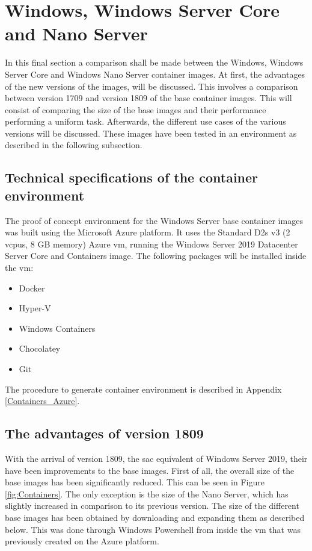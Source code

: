 \section{Windows, Windows Server Core and Nano Server}
In this final section a comparison shall be made between the Windows, Windows Server Core and Windows Nano Server container images. At first, the advantages of the new versions of the images, will be discussed. This involves a comparison between version 1709 and version 1809 of the base container images. This will consist of comparing the size of the base images and their performance performing a uniform task. Afterwards, the different use cases of the various versions will be discussed. These images have been tested in an environment as described in the following subsection.

\subsection{Technical specifications of the container environment}
The proof of concept environment for the Windows Server base container images was built using the Microsoft Azure platform. It uses the Standard D2s v3 (2 vcpus, 8 GB memory) Azure \acrshort{vm}, running the Windows Server 2019 Datacenter Server Core and Containers image.
The following packages will be installed inside the \acrshort{vm}:
\begin{itemize}
	\item Docker
	\item Hyper-V
	\item Windows Containers
	\item Chocolatey
	\item Git
\end{itemize}
The procedure to generate container environment is described in Appendix \ref{Containers_Azure}.

\subsection{The advantages of version 1809}
With the arrival of version 1809, the \acrfull{sac} equivalent of Windows Server 2019, their have been improvements to the base images. First of all, the overall size of the base images has been significantly reduced. This can be seen in Figure \ref{fig:Containers}. The only exception is the size of the Nano Server, which has slightly increased in comparison to its previous version. 
The size of the different base images has been obtained by downloading and expanding them as described below. This was done through Windows Powershell from inside the \acrshort{vm} that was previously created on the Azure platform. 

